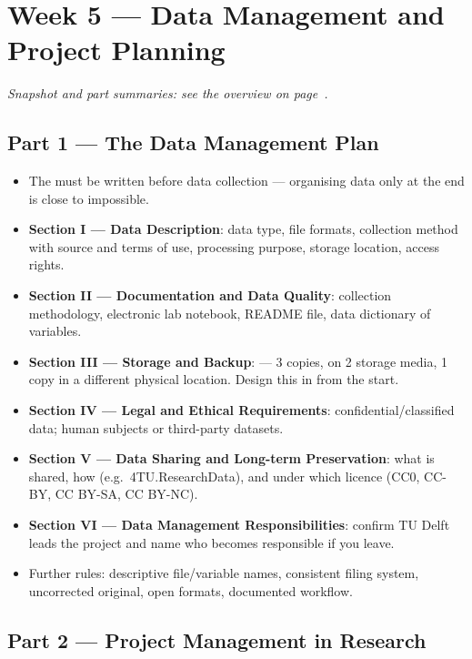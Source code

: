 \documentclass[../main.tex]{subfiles}
\begin{document}
\setlength{\parskip}{3pt}

\chapter{Week 5 — Data Management and Project Planning}
\label{ch:week5}

\textit{Snapshot and part summaries: see the overview on page~\pageref{ov:week5}.}

\section{Part 1 — The Data Management Plan}
\label{sec:dmp}

\begin{itemize}
  \item The  must be written before data collection — organising data only at the end is close to impossible.
  \item \textbf{Section I — Data Description}: data type, file formats, collection method with source and terms of use, processing purpose, storage location, access rights.
  \item \textbf{Section II — Documentation and Data Quality}: collection methodology, electronic lab notebook, README file, data dictionary of variables.
  \item \textbf{Section III — Storage and Backup}:  — 3 copies, on 2 storage media, 1 copy in a different physical location. Design this in from the start.
  \item \textbf{Section IV — Legal and Ethical Requirements}: confidential/classified data; human subjects or third-party datasets.
  \item \textbf{Section V — Data Sharing and Long-term Preservation}: what is shared, how (e.g.\ 4TU.ResearchData), and under which licence (CC0, CC-BY, CC BY-SA, CC BY-NC).
  \item \textbf{Section VI — Data Management Responsibilities}: confirm TU Delft leads the project and name who becomes responsible if you leave.
  \item Further rules: descriptive file/variable names, consistent filing system, uncorrected original, open formats, documented workflow.
\end{itemize}

\section{Part 2 — Project Management in Research}
\label{sec:project-mgmt}
\end{document}
